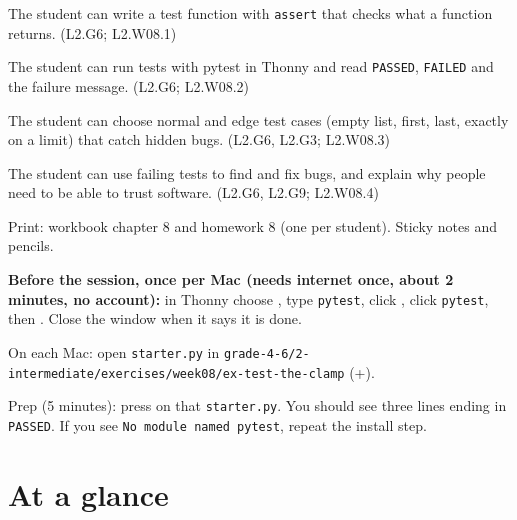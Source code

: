 
\begin{objectives}
  \item The student can write a test function with \texttt{assert} that checks what a function returns. (L2.G6; L2.W08.1)
  \item The student can run tests with pytest in Thonny and read \texttt{PASSED}, \texttt{FAILED} and the failure message. (L2.G6; L2.W08.2)
  \item The student can choose normal and edge test cases (empty list, first, last, exactly on a limit) that catch hidden bugs. (L2.G6, L2.G3; L2.W08.3)
  \item The student can use failing tests to find and fix bugs, and explain why people need to be able to trust software. (L2.G6, L2.G9; L2.W08.4)
\end{objectives}

\begin{materials}
  \item Print: workbook chapter 8 and homework 8 (one per student). Sticky notes and pencils.
  \item \textbf{Before the session, once per Mac (needs internet once, about 2 minutes, no account):} in Thonny choose ,
        type \texttt{pytest}, click , click \texttt{pytest}, then . Close the window when it says it is done.
  \item On each Mac: open \texttt{starter.py} in \texttt{grade-4-6/2-intermediate/exercises/week08/ex-test-the-clamp} (+).
  \item Prep (5 minutes): press  on that \texttt{starter.py}. You should see three lines ending in \texttt{PASSED}. If you see
        \texttt{No module named pytest}, repeat the install step.
\end{materials}

\section{At a glance}
\begin{timeplan}
\end{timeplan}

